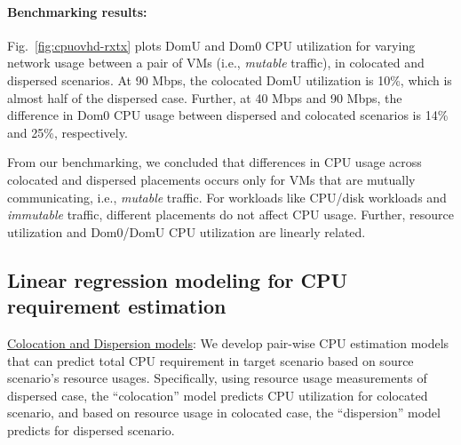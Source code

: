 \paragraph{Benchmarking results:}
Fig.~\ref{fig:cpuovhd-rxtx} plots DomU and Dom0 CPU utilization 
for varying network usage between a pair of VMs (i.e., \textit{mutable} 
traffic), in colocated
and dispersed scenarios. %
At 90 Mbps, the colocated DomU utilization is 10\%,
which is almost half of the dispersed case.
Further, at 40 Mbps and 90 Mbps,
the difference in Dom0 CPU usage between
dispersed and colocated scenarios is 14\% and 25\%, respectively.

From our benchmarking, we concluded that differences in CPU usage across
colocated and dispersed placements occurs only for 
VMs that are mutually communicating, i.e., \textit{mutable} traffic. 
For workloads like CPU/disk workloads and 
\textit{immutable} traffic, different placements do not
affect CPU usage. 
Further, resource utilization and Dom0/DomU CPU utilization are linearly
related.

\subsection{Linear regression modeling for CPU requirement estimation}
\underline{Colocation and Dispersion models}:
We develop pair-wise CPU estimation models
that can predict total CPU requirement in target scenario
based on source scenario's resource usages. 
Specifically, using resource usage measurements of dispersed 
case, the ``colocation'' model predicts CPU utilization for 
colocated scenario, and based on resource usage in colocated case,
the ``dispersion'' model predicts for dispersed scenario.

